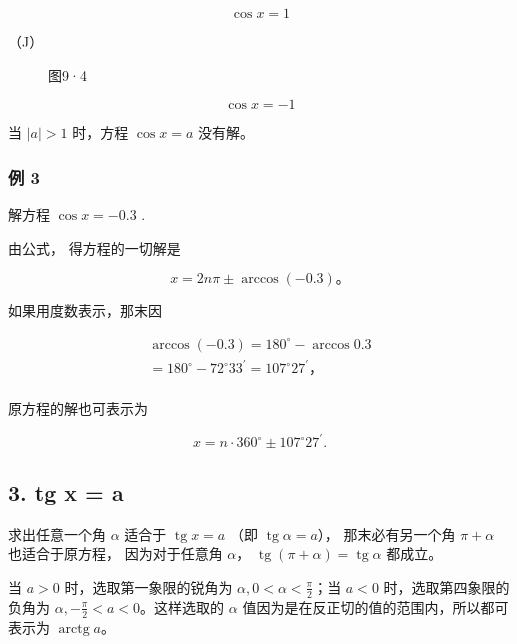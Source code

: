 \[
\cos x = 1
\]

（J）

\begin{figure}
\centering
{}
\caption{图9·4}
\end{figure}

\[
\cos x = - 1
\]

当 \(|a|>1\) 时，方程 \(\cos x = a\) 没有解。

\subsubsection{例 3}

解方程 \(\cos x = -0.3\) .

 由公式， 得方程的一切解是

\[
x = 2 n \pi \pm \arccos (- 0.3)\text{。}
\]

如果用度数表示，那末因

\[
\begin{array}{l} \arccos (- 0.3) = 180 ^{\circ} - \arccos 0.3 \\ = 180 ^{\circ} - 72 ^{\circ} 33 ^{\prime} = 107 ^{\circ} 27 ^{\prime}\text{，} \\ \end{array}
\]

原方程的解也可表示为

\[
x = n \cdot 360 ^{\circ} \pm 107 ^{\circ} 27 ^{\prime}.
\]

\subsection{3. tg x = a}\label{tg-x-a}

求出任意一个角 \(\alpha\) 适合于 \(\operatorname{tg} x = a\) （即
\(\operatorname{tg}\alpha=a\)）， 那末必有另一个角 \(\pi + \alpha\)
也适合于原方程， 因为对于任意角 \(\alpha\)，
\(\operatorname{tg}(\pi + \alpha) = \operatorname{tg} \alpha\) 都成立。

当 \(a>0\) 时，选取第一象限的锐角为
\(\alpha, 0 < \alpha < \frac{\pi}{2}\)；当 \(a<0\)
时，选取第四象限的负角为 \(\alpha, -\frac{\pi}{2} < a<0\)。这样选取的
\(\alpha\) 值因为是在反正切的值的范围内，所以都可表示为
\(\operatorname{arctg}a\)。

